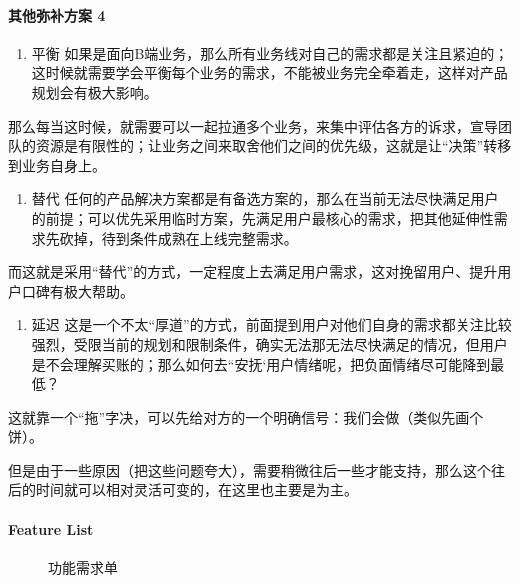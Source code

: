 \documentclass[letterpaper,11pt,english]{sphinxmanual}
\begin{document}
\paragraph{其他弥补方案 4\sphinxfootnotemark[588]}
\label{\detokenize{chapter_knowledge/upgrade_manage:id20}}%
\begin{footnotetext}[588]\sphinxAtStartFootnote
{}
%
\end{footnotetext}\ignorespaces \begin{enumerate}
%
\item {} 
平衡
如果是面向B端业务，那么所有业务线对自己的需求都是关注且紧迫的；这时候就需要学会平衡每个业务的需求，不能被业务完全牵着走，这样对产品规划会有极大影响。

\end{enumerate}

那么每当这时候，就需要可以一起拉通多个业务，来集中评估各方的诉求，宣导团队的资源是有限性的；让业务之间来取舍他们之间的优先级，这就是让“决策”转移到业务自身上。
\begin{enumerate}
%
\setcounter{enumi}{1}
\item {} 
替代
任何的产品解决方案都是有备选方案的，那么在当前无法尽快满足用户的前提；可以优先采用临时方案，先满足用户最核心的需求，把其他延伸性需求先砍掉，待到条件成熟在上线完整需求。

\end{enumerate}

而这就是采用“替代”的方式，一定程度上去满足用户需求，这对挽留用户、提升用户口碑有极大帮助。
\begin{enumerate}
%
\setcounter{enumi}{2}
\item {} 
延迟
这是一个不太“厚道”的方式，前面提到用户对他们自身的需求都关注比较强烈，受限当前的规划和限制条件，确实无法那无法尽快满足的情况，但用户是不会理解买账的；那么如何去“安抚‘用户情绪呢，把负面情绪尽可能降到最低？

\end{enumerate}

这就靠一个“拖”字决，可以先给对方的一个明确信号：我们会做（类似先画个饼）。

但是由于一些原因（把这些问题夸大），需要稍微往后一些才能支持，那么这个往后的时间就可以相对灵活可变的，在这里也主要是为主。


\paragraph{Feature List}
\label{\detokenize{chapter_knowledge/upgrade_manage:feature-list}}
\begin{figure}[H]
\centering
\capstart

\noindent{}
\caption{功能需求单}\label{\detokenize{chapter_knowledge/upgrade_manage:id26}}\end{figure}
\end{document}
